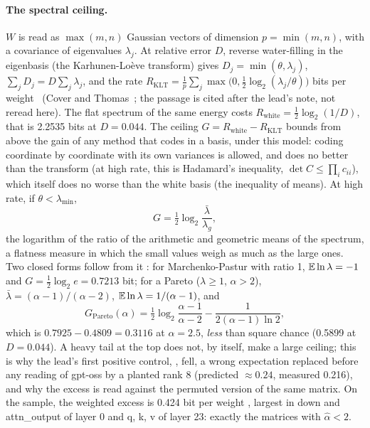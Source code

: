 \paragraph{The spectral ceiling.} $W$ is read as $\max(m, n)$ Gaussian vectors of dimension $p = \min(m, n)$, with a covariance of eigenvalues $\lambda_j$. At relative error $D$, reverse water-filling in the eigenbasis (the Karhunen-Loève transform) gives $D_j = \min(\theta, \lambda_j)$, $\sum_j D_j = D\sum_j\lambda_j$, and the rate $R_{\mathrm{KLT}} = \frac1p\sum_j\max\bigl(0, \tfrac12\log_2(\lambda_j/\theta)\bigr)$ bits per weight \litt~(Cover and Thomas~\cite{cover2006}; the passage is cited after the lead's note, not reread here). The flat spectrum of the same energy costs $R_{\text{white}} = \tfrac12\log_2(1/D)$, that is 2.2535 bits at $D = 0.044$. The ceiling $G = R_{\text{white}} - R_{\mathrm{KLT}}$ bounds from above the gain of any method that codes in a basis, under this model: coding coordinate by coordinate with its own variances is allowed, and does no better than the transform (at high rate, this is Hadamard's inequality, $\det C \le \prod_i c_{ii}$), which itself does no worse than the white basis (the inequality of means). At high rate, if $\theta < \lambda_{\min}$,
\begin{equation}\label{t3spe:eq:platitude}
G = \tfrac12\log_2\frac{\bar\lambda}{\lambda_g},
\end{equation}
the logarithm of the ratio of the arithmetic and geometric means of the spectrum, a flatness measure in which the small values weigh as much as the large ones. Two closed forms follow from it \calc: for Marchenko-Pastur with ratio 1, $\mathbb{E}\ln\lambda = -1$ and $G = \tfrac12\log_2 e = 0.7213$ bit; for a Pareto ($\lambda \ge 1$, $\alpha > 2$), $\bar\lambda = (\alpha - 1)/(\alpha - 2)$, $\mathbb{E}\ln\lambda = 1/(\alpha - 1)$, and
\begin{equation}\label{t3spe:eq:pareto}
G_{\text{Pareto}}(\alpha) = \tfrac12\log_2\frac{\alpha - 1}{\alpha - 2} - \frac{1}{2(\alpha - 1)\ln 2},
\end{equation}
which is $0.7925 - 0.4809 = 0.3116$ at $\alpha = 2.5$, \emph{less} than square chance (0.5899 at $D = 0.044$). A heavy tail at the top does not, by itself, make a large ceiling; this is why the lead's first positive control, , fell, a wrong expectation replaced before any reading of gpt-oss by a planted rank 8 (predicted $\approx 0.24$, measured 0.216), and why the excess is read against the permuted version of the same matrix. On the sample, the weighted excess is 0.424 bit per weight , largest in down and attn\_output of layer 0 and q, k, v of layer 23: exactly the matrices with $\hat\alpha < 2$.

